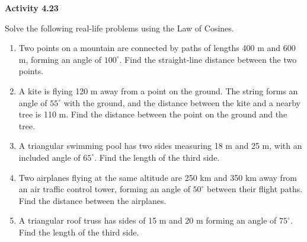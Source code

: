 \vspace{0.3ex}
\noindent\textbf{Activity 4.23}

\vspace{0.2ex}

Solve the following real-life problems using the Law of Cosines.  

\begin{enumerate}
    \item Two points on a mountain are connected by paths of lengths 400 m and 600 m, forming an angle of \(100^\circ\). Find the straight-line distance between the two points.
    \item A kite is flying 120 m away from a point on the ground. The string forms an angle of \(55^\circ\) with the ground, and the distance between the kite and a nearby tree is 110 m. Find the distance between the point on the ground and the tree.
    \item A triangular swimming pool has two sides measuring 18 m and 25 m, with an included angle of \(65^\circ\). Find the length of the third side.
    \item Two airplanes flying at the same altitude are 250 km and 350 km away from an air traffic control tower, forming an angle of \(50^\circ\) between their flight paths. Find the distance between the airplanes.
    \item A triangular roof truss has sides of 15 m and 20 m forming an angle of \(75^\circ\). Find the length of the third side.
\end{enumerate}
